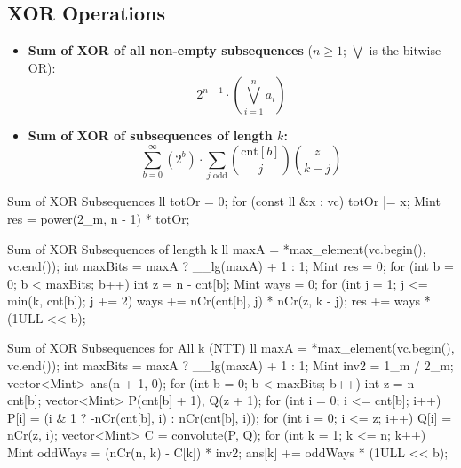 \documentclass[10pt]{article}
\newcommand{\complexity}[1]{%
  \tcbox[on line,
    colback=tagbg,
    colframe=tagbg,
    boxrule=0pt,
    arc=2pt,
    boxsep=0pt,
    left=3.5pt, right=3.5pt, top=1.5pt, bottom=1.5pt
  ]{\color{tagtext}\scriptsize\bfseries\ensuremath{#1}}%
}
\begin{document}

\subsection{XOR Operations}
\begin{itemize}
    \item \textbf{Sum of XOR of all non-empty subsequences} ($n \ge 1$; $\bigvee$ is the bitwise OR):
          \[ 2^{n - 1} \cdot \left( \bigvee_{i=1}^n a_i \right) \]
    \item \textbf{Sum of XOR of subsequences of length $k$:}
          \[ \sum_{b = 0}^{\infty} (2^b) \cdot \sum_{j \text{ odd}} \binom{\text{cnt}[b]}{j} \binom{z}{k - j} \]
\end{itemize}

\begin{vscode}{Sum of XOR Subsequences \complexity{O(N)}}
ll totOr = 0;
for (const ll &x : vc) 
    totOr |= x;
Mint res = power(2_m, n - 1) * totOr;
\end{vscode}

\begin{vscode}{Sum of XOR Subsequences of length k \complexity{O(N \log(\max A))}}
ll maxA = *max_element(vc.begin(), vc.end());
int maxBits = maxA ? __lg(maxA) + 1 : 1;
Mint res = 0;
for (int b = 0; b < maxBits; b++) 
{
    int z = n - cnt[b];
    Mint ways = 0;
    for (int j = 1; j <= min(k, cnt[b]); j += 2) 
        ways += nCr(cnt[b], j) * nCr(z, k - j);
    res += ways * (1ULL << b);
}
\end{vscode}

\begin{vscode}{Sum of XOR Subsequences for All k (NTT) \complexity{O(N \log N \log(\max A))}}
ll maxA = *max_element(vc.begin(), vc.end());
int maxBits = maxA ? __lg(maxA) + 1 : 1;
Mint inv2 = 1_m / 2_m;
vector<Mint> ans(n + 1, 0);
for (int b = 0; b < maxBits; b++) 
{
    int z = n - cnt[b];
    vector<Mint> P(cnt[b] + 1), Q(z + 1);
    for (int i = 0; i <= cnt[b]; i++) 
        P[i] = (i & 1 ? -nCr(cnt[b], i) : nCr(cnt[b], i));
    for (int i = 0; i <= z; i++) Q[i] = nCr(z, i);
    vector<Mint> C = convolute(P, Q);
    for (int k = 1; k <= n; k++) 
    {
        Mint oddWays = (nCr(n, k) - C[k]) * inv2;
        ans[k] += oddWays * (1ULL << b);
    }
}
\end{vscode}
\end{document}
